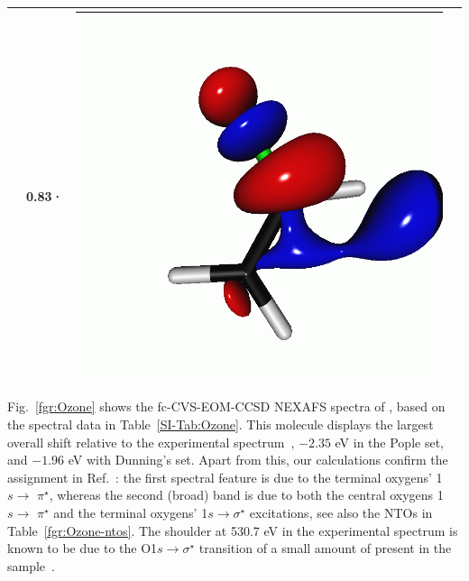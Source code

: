 \documentclass[journal=jctcce,manuscript=article]{achemso}
\begin{document}
\begin{table}[H]
\begin{tabular}{ c | c c c }
\begin{minipage}{0.2\textwidth}
     \end{minipage}
     & 0.83·
     &  \begin{minipage}{0.2\textwidth}
         \centering
         \includegraphics[scale=0.10]{NTO/CH2CHF/CH2CHF_F_3p.png}
     \end{minipage}
     \\
     \hline
 \end{tabular}
 \end{table}
%

\clearpage
Fig.~\ref{fgr:Ozone} shows the fc-CVS-EOM-CCSD NEXAFS spectra of , based on the spectral data in Table~\ref{SI-Tab:Ozone}. This molecule displays the largest overall shift relative to the experimental spectrum~\cite{ozone_nexafs_xps}, $-2.35$ eV in the Pople set, and $-1.96$ eV with Dunning's set.
Apart from this, our calculations confirm the assignment in Ref.~: the first spectral feature is due to the terminal oxygens' 1$s\to$ $\pi^\star$, whereas the second (broad) band is due to
both the central oxygens 1$s\to$ $\pi^\star$ and the terminal oxygens' 1$s \to \sigma^\star$ excitations, see also the NTOs in Table~\ref{fgr:Ozone-ntos}.
The shoulder at 530.7 eV in the experimental spectrum is known to be due to the O1$s\to \sigma^\star$ transition of a small amount of  present in the sample~\cite{ozone_nexafs_xps}.
\end{document}
